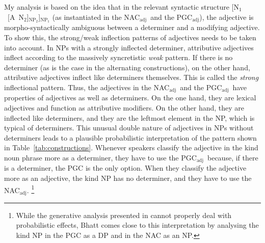 \documentclass[USenglish]{article}
\newcommand{\Sub}[1]{\ensuremath{\mathrm{_{#1}}}}
\newcommand{\NACa}{NAC\Sub{adj}}
\newcommand{\PGCa}{PGC\Sub{adj}}
\begin{document}
My analysis is based on the idea that in the relevant syntactic structure [N\Sub{1}~[A~N\Sub{2}]\Sub{NP\Sub{2}}]\Sub{NP\Sub{1}} (as instantiated in the \NACa\ and the \PGCa), the adjective is morpho-syntactically ambiguous between a determiner and a modifying adjective.
To show this, %
the strong\slash weak inflection patterns of adjectives needs to be taken into account.
In NPs with a strongly inflected determiner, attributive adjectives inflect according to the massively syncretistic \textit{weak} pattern.
If there is no determiner (as is the case in the alternating constructions), on the other hand, attributive adjectives inflect like determiners themselves.
This is called the \textit{strong} inflectional pattern.
Thus, the adjectives in the \NACa\ and the \PGCa\ have properties of adjectives as well as determiners.
On the one hand, they are lexical adjectives and function as attributive modifiers.
On the other hand, they are inflected like determiners, and they are the leftmost element in the NP, which is typical of determiners.
This unusual double nature of adjectives in NPs without determiners leads to a plausible probabilistic interpretation of the pattern shown in Table~\ref{tab:constructions}.
Whenever speakers classify the adjective in the kind noun phrase more as a determiner, they have to use the \PGCa\ because, if there is a determiner, the PGC is the only option.
When they classify the adjective more as an adjective, the kind NP has no determiner, and they have to use the \NACa.%
\footnote{While the generative analysis presented in \cite{Bhatt1990} cannot properly deal with probabilistic effects, Bhatt comes close to this interpretation by analysing the kind NP in the PGC as a DP and in the NAC as an NP.}
\end{document}
